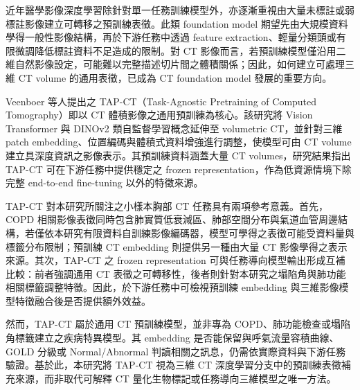 \begin{ZhChapter}
近年醫學影像深度學習除針對單一任務訓練模型外，亦逐漸重視由大量未標註或弱標註影像建立可轉移之預訓練表徵。此類 foundation model 期望先由大規模資料學得一般性影像結構，再於下游任務中透過 feature extraction、輕量分類頭或有限微調降低標註資料不足造成的限制。對 CT 影像而言，若預訓練模型僅沿用二維自然影像設定，可能難以完整描述切片間之體積關係；因此，如何建立可處理三維 CT volume 的通用表徵，已成為 CT foundation model 發展的重要方向。

Veenboer 等人提出之 TAP-CT（Task-Agnostic Pretraining of Computed Tomography）即以 CT 體積影像之通用預訓練為核心。該研究將 Vision Transformer 與 DINOv2 類自監督學習概念延伸至 volumetric CT，並針對三維 patch embedding、位置編碼與體積式資料增強進行調整，使模型可由 CT volume 建立具深度資訊之影像表示。其預訓練資料涵蓋大量 CT volumes，研究結果指出 TAP-CT 可在下游任務中提供穩定之 frozen representation，作為低資源情境下除完整 end-to-end fine-tuning 以外的特徵來源\cite{veenboer2025tapct}。

TAP-CT 對本研究所關注之小樣本胸部 CT 任務具有兩項參考意義。首先，COPD 相關影像表徵同時包含肺實質低衰減區、肺部空間分布與氣道血管周邊結構，若僅依本研究有限資料自訓練影像編碼器，模型可學得之表徵可能受資料量與標籤分布限制；預訓練 CT embedding 則提供另一種由大量 CT 影像學得之表示來源。其次，TAP-CT 之 frozen representation 可與任務導向模型輸出形成互補比較：前者強調通用 CT 表徵之可轉移性，後者則針對本研究之塌陷角與肺功能相關標籤調整特徵。因此，於下游任務中可檢視預訓練 embedding 與三維影像模型特徵融合後是否提供額外效益。

然而，TAP-CT 屬於通用 CT 預訓練模型，並非專為 COPD、肺功能檢查或塌陷角標籤建立之疾病特異模型。其 embedding 是否能保留與呼氣流量容積曲線、GOLD 分級或 Normal/Abnormal 判讀相關之訊息，仍需依實際資料與下游任務驗證。基於此，本研究將 TAP-CT 視為三維 CT 深度學習分支中的預訓練表徵補充來源，而非取代可解釋 CT 量化生物標記或任務導向三維模型之唯一方法。

\end{ZhChapter}
